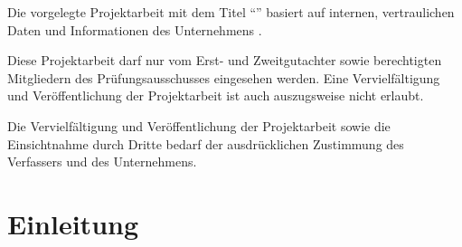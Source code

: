 \documentclass[a4paper, 12pt]{article}
\begin{document}
Die vorgelegte Projektarbeit mit dem Titel \enquote{\Titel} basiert auf internen, vertraulichen Daten und Informationen des Unternehmens \Firma.

Diese Projektarbeit darf nur vom Erst- und Zweitgutachter sowie berechtigten Mitgliedern des Prüfungsausschusses eingesehen werden.
Eine Vervielfältigung und Veröffentlichung der Projektarbeit ist auch auszugsweise nicht erlaubt.

Die Vervielfältigung und Veröffentlichung der Projektarbeit sowie die Einsichtnahme durch Dritte bedarf der ausdrücklichen
Zustimmung des Verfassers und des Unternehmens.
\clearpage

\setcounter{page}{1}


\tableofcontents
\newpage


\setlength{\cftfigindent}{0em}
\setlength{\cftfignumwidth}{8em}
\renewcommand{\cftfigpresnum}{Abbildung }
\listoffigures
\newpage


\setlength{\cfttabindent}{0em}
\setlength{\cfttabnumwidth}{5.5em}
\renewcommand{\cfttabpresnum}{Tabelle }
\listoftables
\newpage

\setcounter{page}{1}


\section{Einleitung}
\end{document}
